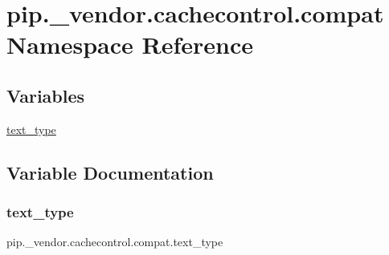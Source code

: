\hypertarget{namespacepip_1_1__vendor_1_1cachecontrol_1_1compat}{}\section{pip.\+\_\+vendor.\+cachecontrol.\+compat Namespace Reference}
\label{namespacepip_1_1__vendor_1_1cachecontrol_1_1compat}
\subsection*{Variables}
\begin{DoxyCompactItemize}
\item 
\hyperlink{namespacepip_1_1__vendor_1_1cachecontrol_1_1compat_a8012a720c0329e523d05796f236754fd}{text\+\_\+type}
\end{DoxyCompactItemize}


\subsection{Variable Documentation}
\mbox{\label{namespacepip_1_1__vendor_1_1cachecontrol_1_1compat_a8012a720c0329e523d05796f236754fd}} 
\subsubsection{\texorpdfstring{text\+\_\+type}{text\_type}}
{\footnotesize\ttfamily pip.\+\_\+vendor.\+cachecontrol.\+compat.\+text\+\_\+type}


